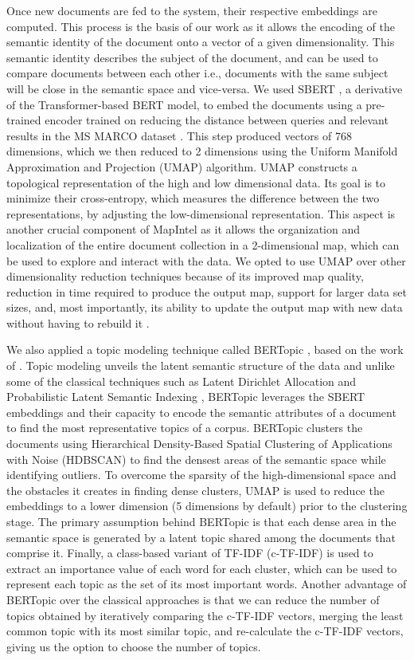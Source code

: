 \documentclass[a4paper]{article}
\begin{document}
Once new documents are fed to the system, their respective embeddings are computed. This process is the basis of our work as it allows the encoding of the semantic identity of the document onto a vector of a given dimensionality. This semantic identity describes the subject of the document, and can be used to compare documents between each other i.e., documents with the same subject will be close in the semantic space and vice-versa. We used SBERT \citep{reimers2019}, a derivative of the Transformer-based BERT model, to embed the documents using a pre-trained encoder trained on reducing the distance between queries and relevant results in the MS MARCO dataset \citep{bajaj2018}. This step produced vectors of 768 dimensions, which we then reduced to 2 dimensions using the Uniform Manifold Approximation and Projection (UMAP) \citep{mcinnes2020} algorithm. UMAP constructs a topological representation of the high and low dimensional data. Its goal is to minimize their cross-entropy, which measures the difference between the two representations, by adjusting the low-dimensional representation. This aspect is another crucial component of MapIntel as it allows the organization and localization of the entire document collection in a 2-dimensional map, which can be used to explore and interact with the data. We opted to use UMAP over other dimensionality reduction techniques because of its improved map quality, reduction in time required to produce the output map, support for larger data set sizes, and, most importantly, its ability to update the output map with new data without having to rebuild it \citep{mcinnes2020}.

We also applied a topic modeling technique called BERTopic \citep{grootendorst2020}, based on the work of \citet{angelov2020}. Topic modeling unveils the latent semantic structure of the data and unlike some of the classical techniques such as Latent Dirichlet Allocation \citep{blei2003} and Probabilistic Latent Semantic Indexing \citep{hofmann1999}, BERTopic leverages the SBERT embeddings and their capacity to encode the semantic attributes of a document to find the most representative topics of a corpus. BERTopic clusters the documents using Hierarchical Density-Based Spatial Clustering of Applications with Noise (HDBSCAN) \citep{mcinnes2017} to find the densest areas of the semantic space while identifying outliers. To overcome the sparsity of the high-dimensional space and the obstacles it creates in finding dense clusters, UMAP is used to reduce the embeddings to a lower dimension (5 dimensions by default) prior to the clustering stage. The primary assumption behind BERTopic is that each dense area in the semantic space is generated by a latent topic shared among the documents that comprise it. Finally, a class-based variant of TF-IDF \citep{jones1972} (c-TF-IDF) is used to extract an importance value of each word for each cluster, which can be used to represent each topic as the set of its most important words. Another advantage of BERTopic over the classical approaches is that we can reduce the number of topics obtained by iteratively comparing the c-TF-IDF vectors, merging the least common topic with its most similar topic, and re-calculate the c-TF-IDF vectors, giving us the option to choose the number of topics.
\end{document}
